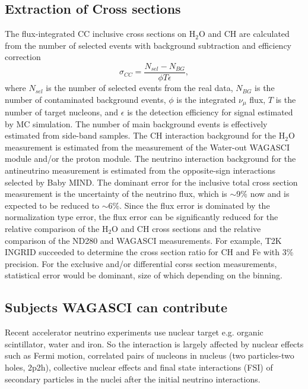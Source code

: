\subsection{Extraction of Cross sections}
The flux-integrated CC inclusive cross sections on $\mathrm{H_2O}$ and CH are calculated from the number of selected events
with background subtraction and efficiency correction
\begin{equation*}
\sigma_{CC} = \frac{N_{sel}-N_{BG}}{\phi T \epsilon},
\end{equation*}
where $N_{sel}$ is the number of selected events from the real data,
$N_{BG}$ is the number of contaminated background events,
$\phi$ is the integrated $\nu_{\mu}$ flux, $T$ is the number of target nucleons,
and $\epsilon$ is the detection efficiency for signal estimated by MC simulation.
The number of main background events is effectively estimated from side-band samples.
The CH interaction background for the $\mathrm{H_2O}$ measurement is estimated from the measurement of the Water-out WAGASCI module and/or
the proton module.
The neutrino interaction background for the antineutrino measurement is estimated from the opposite-sign interactions selected by Baby MIND.
The dominant error for the inclusive total cross section measurement is the uncertainty of the neutrino flux, which is $\sim$9\% now and is expected to be reduced to $\sim$6\%.
Since the flux error is dominated by the normalization type error,
the flux error can be significantly reduced for the relative comparison of the $\mathrm{H_2O}$ and CH cross sections
and the relative comparison of the ND280 and WAGASCI measurements.
For example, T2K INGRID succeeded to determine the cross section ratio for CH and Fe with 3\% precision\cite{ingrid_ccinclusive}.
For the exclusive and/or differential corss section measurements, statistical error would be dominant, size of which depending on the binning.

\subsection{Subjects WAGASCI can contribute}
Recent accelerator neutrino experiments use nuclear target e.g. organic scintillator, water and iron.
So the interaction is largely affected by nuclear effects such as Fermi motion, correlated pairs of nucleons in nucleus (two particles-two holes, 2p2h), collective nuclear effects 
and final state interactions (FSI) of secondary particles in the nuclei after the initial neutrino interactions.

